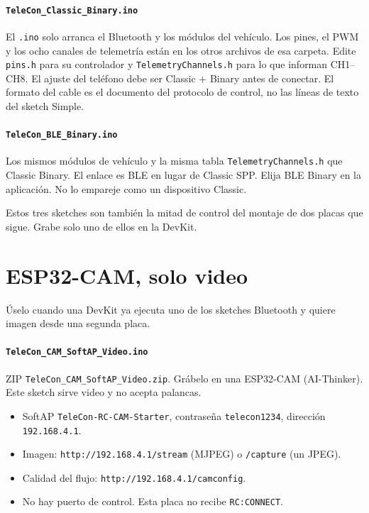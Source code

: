 \documentclass[12pt,a4paper]{article}
\begin{document}
\paragraph{\texttt{TeleCon\_Classic\_Binary.ino}}
El \texttt{.ino} solo arranca el Bluetooth y los módulos del vehículo.
Los pines, el PWM y los ocho canales de telemetría están en los otros
archivos de esa carpeta. Edite \texttt{pins.h} para su controlador y
\texttt{TelemetryChannels.h} para lo que informan CH1--CH8. El ajuste del
teléfono debe ser Classic + Binary antes de conectar. El formato del cable
es el documento del protocolo de control, no las líneas de texto del
sketch Simple.

\paragraph{\texttt{TeleCon\_BLE\_Binary.ino}}
Los mismos módulos de vehículo y la misma tabla
\texttt{TelemetryChannels.h} que Classic Binary. El enlace es BLE en lugar
de Classic SPP. Elija BLE Binary en la aplicación. No lo empareje como un
dispositivo Classic.

Estos tres sketches son también la mitad de control del montaje de dos
placas que sigue. Grabe solo uno de ellos en la DevKit.

\section{ESP32-CAM, solo video}

Úselo cuando una DevKit ya ejecuta uno de los sketches Bluetooth y quiere
imagen desde una segunda placa.

\paragraph{\texttt{TeleCon\_CAM\_SoftAP\_Video.ino}}
ZIP \texttt{TeleCon\_CAM\_SoftAP\_Video.zip}. Grábelo en una ESP32-CAM
(AI-Thinker). Este sketch sirve video y no acepta palancas.

\begin{itemize}[leftmargin=1.4cm]
  \item SoftAP \texttt{TeleCon-RC-CAM-Starter}, contraseña
        \texttt{telecon1234}, dirección \texttt{192.168.4.1}.
  \item Imagen: \texttt{http://192.168.4.1/stream} (MJPEG) o
        \texttt{/capture} (un JPEG).
  \item Calidad del flujo: \texttt{http://192.168.4.1/camconfig}.
  \item No hay puerto de control. Esta placa no recibe \texttt{RC:CONNECT}.
\end{itemize}
\end{document}
